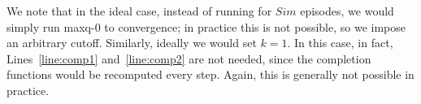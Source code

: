 We note that in the ideal case, instead of running for $Sim$ episodes,
we would simply run {\sc maxq-0} to convergence; in practice this is
not possible, so we impose an arbitrary cutoff. Similarly, ideally we
would set $k=1$. In this case, in fact, Lines~\ref{line:comp1}
and~\ref{line:comp2} are not needed, since the completion functions
would be recomputed every step. Again, this is generally not possible in
practice. 


